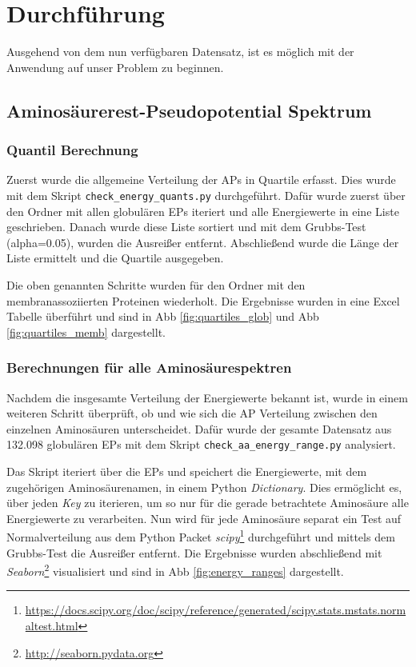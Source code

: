 \chapter{Durchführung}
\label{chap:durchfuerung}

Ausgehend von dem nun verfügbaren Datensatz, ist es möglich mit der Anwendung auf unser Problem zu beginnen.



\section{Aminosäurerest-Pseudopotential Spektrum}


\subsection{Quantil Berechnung}

Zuerst wurde die allgemeine Verteilung der \ac{APs} in Quartile erfasst. Dies wurde mit dem Skript \texttt{check\_energy\_quants.py} durchgeführt. Dafür wurde zuerst über den Ordner mit allen globulären \ac{EP}s iteriert und alle Energiewerte in eine Liste geschrieben. Danach wurde diese Liste sortiert und mit dem Grubbs-Test \cite{Jain.2010} (alpha=0.05), wurden die Ausreißer entfernt. Abschließend wurde die Länge der Liste ermittelt und die Quartile ausgegeben.

Die oben genannten Schritte wurden für den Ordner mit den membranassoziierten Proteinen wiederholt. Die Ergebnisse wurden in eine Excel Tabelle überführt und sind in \ac{Abb} \ref{fig:quartiles_glob} und \ac{Abb} \ref{fig:quartiles_memb} dargestellt.


\subsection{Berechnungen für alle Aminosäurespektren}
Nachdem die insgesamte Verteilung der Energiewerte bekannt ist, wurde in einem weiteren Schritt überprüft, ob und wie sich die \ac{AP} Verteilung zwischen den einzelnen Aminosäuren unterscheidet. Dafür wurde der gesamte Datensatz aus 132.098 globulären \ac{EP}s mit dem Skript \texttt{check\_aa\_energy\_range.py} analysiert. 

Das Skript iteriert über die \ac{EP}s und speichert die Energiewerte, mit dem zugehörigen Aminosäurenamen, in einem Python \emph{Dictionary}. Dies ermöglicht es, über jeden \emph{Key} zu iterieren, um so nur für die gerade betrachtete Aminosäure alle Energiewerte zu verarbeiten. Nun wird für jede Aminosäure separat ein Test auf Normalverteilung aus dem Python Packet \emph{scipy}\footnote{\url{https://docs.scipy.org/doc/scipy/reference/generated/scipy.stats.mstats.normaltest.html}} durchgeführt und mittels dem Grubbs-Test die Ausreißer entfernt. Die Ergebnisse wurden abschließend mit \emph{Seaborn}\footnote{\url{http://seaborn.pydata.org}} visualisiert und sind in \ac{Abb} \ref{fig:energy_ranges} dargestellt. 

